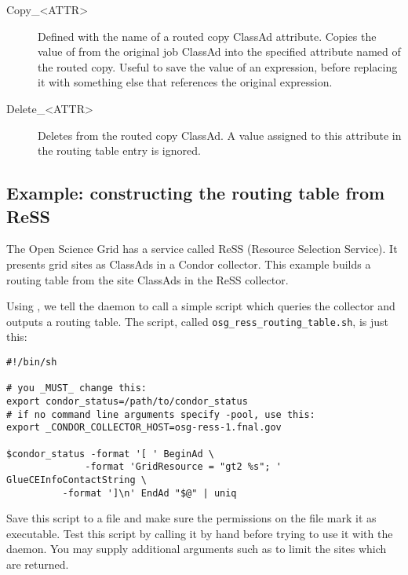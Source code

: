 \begin{description}
\item[Copy\_<ATTR>] Defined with the name of a routed copy ClassAd
attribute. Copies the value of  from the
original job ClassAd into the specified attribute named of the routed copy.
Useful to save the value of an
expression, before replacing it with something else that references the
original expression.

\item[Delete\_<ATTR>] Deletes  from the routed copy
ClassAd.  A value assigned to this attribute in the routing table
entry is ignored.

\end{description}

\subsection{\label{JobRouterReSSExample}Example: constructing the routing table from ReSS}

The Open Science Grid has a service called ReSS (Resource Selection
Service).  It presents grid sites as ClassAds in a Condor collector.
This example builds a routing table from the site ClassAds in the ReSS
collector.

Using , we tell the  daemon to call a
simple script which queries the collector and outputs a routing table.
The script, called \verb|osg_ress_routing_table.sh|, is just this:

\footnotesize
\begin{verbatim}
#!/bin/sh

# you _MUST_ change this:
export condor_status=/path/to/condor_status
# if no command line arguments specify -pool, use this:
export _CONDOR_COLLECTOR_HOST=osg-ress-1.fnal.gov

$condor_status -format '[ ' BeginAd \
              -format 'GridResource = "gt2 %s"; ' GlueCEInfoContactString \
	      -format ']\n' EndAd "$@" | uniq
\end{verbatim}
\normalsize

Save this script to a file and make sure the permissions on the file
mark it as executable.  Test this script by calling it by hand before
trying to use it with the \Condor{job\_router} daemon.  You may supply additional arguments
such as \Opt{-constraint} to limit the sites which are returned.

